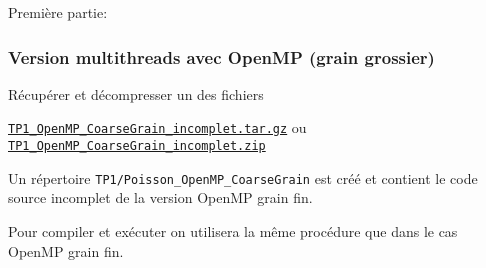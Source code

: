 \documentclass{beamer}
\begin{document}
\begin{frame}
	Première partie:
\bigskip


\end{frame}

\begin{frame}[fragile]
	\frametitle{Version multithreads avec OpenMP (grain grossier)}
	
	Récupérer et décompresser un des fichiers \bigskip
	
	\href{https://perso.ensta-paris.fr/~tajchman/Seance3/TP1_OpenMP_FineGrain_incomplet.tar.gz}{\tt TP1\_OpenMP\_CoarseGrain\_incomplet.tar.gz} ou \href{https://perso.ensta-paris.fr/~tajchman/Seance3/TP1_OpenMP_FineGrain_incomplet.zip}{\tt TP1\_OpenMP\_CoarseGrain\_incomplet.zip}
	\bigskip
	
	Un répertoire {\tt TP1/Poisson\_OpenMP\_CoarseGrain} est créé et contient le code source incomplet de la version OpenMP grain fin.
	
	\vfill
	Pour compiler et exécuter on utilisera la même procédure que dans le cas OpenMP grain fin.
	
\end{frame}
\end{document}
